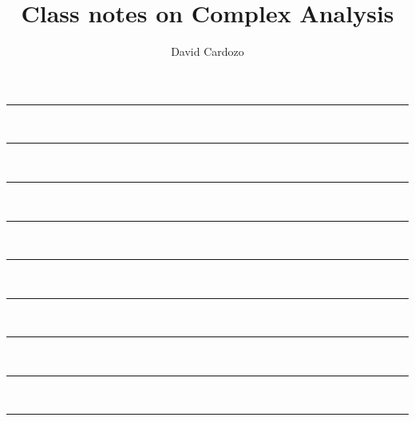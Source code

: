 \documentclass[notitlepage]{article}
\author{David Cardozo}
\title{Class notes on Complex Analysis}
\begin{document}



\noindent\rule{\textwidth}{1pt}\\[-0.1cm]


\noindent\rule{\textwidth}{1pt}\\[-0.1cm]


\noindent\rule{\textwidth}{1pt}\\[-0.1cm]
	

\noindent\rule{\textwidth}{1pt}\\[-0.1cm]



\noindent\rule{\textwidth}{1pt}\\[-0.1cm]



\noindent\rule{\textwidth}{1pt}\\[-0.1cm]


	
\noindent\rule{\textwidth}{1pt}\\[-0.1cm]




\noindent\rule{\textwidth}{1pt}\\[-0.1cm]



\noindent\rule{\textwidth}{1pt}\\[-0.1cm]



\end{document}
